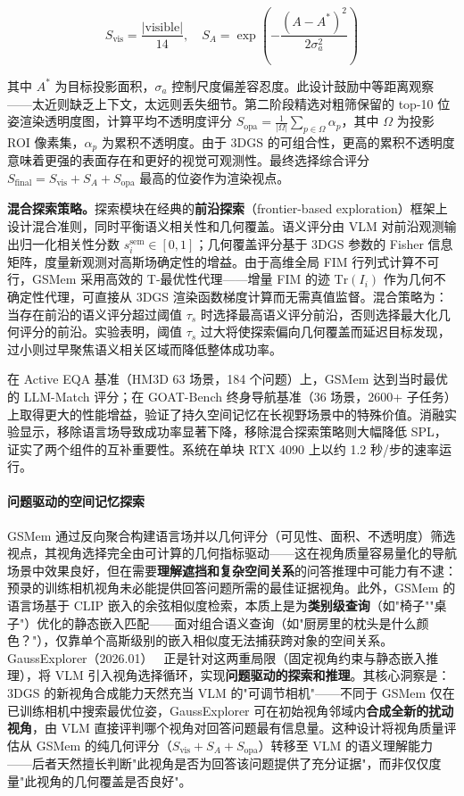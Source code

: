 \begin{equation}
S_{\text{vis}} = \frac{|\text{visible}|}{14}, \quad S_A = \exp\!\left(-\frac{(A - A^*)^2}{2\sigma_a^2}\right)
\end{equation}

其中 $A^*$ 为目标投影面积，$\sigma_a$ 控制尺度偏差容忍度。此设计鼓励中等距离观察——太近则缺乏上下文，太远则丢失细节。第二阶段精选对粗筛保留的 top-10 位姿渲染透明度图，计算平均不透明度评分 $S_{\text{opa}} = \frac{1}{|\Omega|}\sum_{p \in \Omega} \alpha_p$，其中 $\Omega$ 为投影 ROI 像素集，$\alpha_p$ 为累积不透明度。由于 3DGS 的可组合性，更高的累积不透明度意味着更强的表面存在和更好的视觉可观测性。最终选择综合评分 $S_{\text{final}} = S_{\text{vis}} + S_A + S_{\text{opa}}$ 最高的位姿作为渲染视点。

\textbf{混合探索策略。}探索模块在经典的\textbf{前沿探索}（frontier-based exploration）框架上设计混合准则，同时平衡语义相关性和几何覆盖。语义评分由 VLM 对前沿观测输出归一化相关性分数 $s_i^{\text{sem}} \in [0,1]$；几何覆盖评分基于 3DGS 参数的 Fisher 信息矩阵，度量新观测对高斯场确定性的增益。由于高维全局 FIM 行列式计算不可行，GSMem 采用高效的 T-最优性代理——增量 FIM 的迹 $\text{Tr}(I_i)$ 作为几何不确定性代理，可直接从 3DGS 渲染函数梯度计算而无需真值监督。混合策略为：当存在前沿的语义评分超过阈值 $\tau_s$ 时选择最高语义评分前沿，否则选择最大化几何评分的前沿。实验表明，阈值 $\tau_s$ 过大将使探索偏向几何覆盖而延迟目标发现，过小则过早聚焦语义相关区域而降低整体成功率。

在 Active EQA 基准（HM3D 63 场景，184 个问题）上，GSMem 达到当时最优的 LLM-Match 评分；在 GOAT-Bench 终身导航基准（36 场景，2600+ 子任务）上取得更大的性能增益，验证了持久空间记忆在长视野场景中的特殊价值。消融实验显示，移除语言场导致成功率显著下降，移除混合探索策略则大幅降低 SPL，证实了两个组件的互补重要性。系统在单块 RTX 4090 上以约 1.2 秒/步的速率运行。

\paragraph{问题驱动的空间记忆探索}

GSMem 通过反向聚合构建语言场并以几何评分（可见性、面积、不透明度）筛选视点，其视角选择完全由可计算的几何指标驱动——这在视角质量容易量化的导航场景中效果良好，但在需要\textbf{理解遮挡和复杂空间关系}的问答推理中可能力有不逮：预录的训练相机视角未必能提供回答问题所需的最佳证据视角。此外，GSMem 的语言场基于 CLIP 嵌入的余弦相似度检索，本质上是为\textbf{类别级查询}（如"椅子""桌子"）优化的静态嵌入匹配——面对组合语义查询（如"厨房里的枕头是什么颜色？"），仅靠单个高斯级别的嵌入相似度无法捕获跨对象的空间关系。GaussExplorer（2026.01）~\cite{2601_13132} 正是针对这两重局限（固定视角约束与静态嵌入推理），将 VLM 引入视角选择循环，实现\textbf{问题驱动的探索和推理}。其核心洞察是：3DGS 的新视角合成能力天然充当 VLM 的"可调节相机"——不同于 GSMem 仅在已训练相机中搜索最优位姿，GaussExplorer 可在初始视角邻域内\textbf{合成全新的扰动视角}，由 VLM 直接评判哪个视角对回答问题最有信息量。这种设计将视角质量评估从 GSMem 的纯几何评分（$S_{\text{vis}} + S_A + S_{\text{opa}}$）转移至 VLM 的语义理解能力——后者天然擅长判断"此视角是否为回答该问题提供了充分证据"，而非仅仅度量"此视角的几何覆盖是否良好"。

